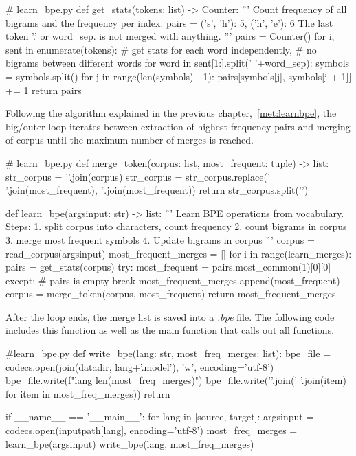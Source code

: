 \begin{python}
# learn_bpe.py
def get_stats(tokens: list) -> Counter:
  '''
  Count frequency of all bigrams and the frequency per index.
  pairs = {
    ('s', 'h'): 5,
    ('h', 'e'): 6
  }
  The last token '.' or word_sep. is not merged with anything.
  '''
  pairs = Counter()
  for i, sent in enumerate(tokens):
    # get stats for each word independently, 
    # no bigrams between different words
    for word in sent[1:].split(' '+word_sep):
      symbols = symbols.split()
      for j in range(len(symbols) - 1):
        pairs[symbols[j], symbols[j + 1]] += 1
  return pairs
\end{python}

Following the algorithm explained in the previous chapter,~\ref{met:learnbpe}, the big/outer loop iterates between extraction of highest frequency pairs and merging of corpus until the maximum number of merges is reached.

\begin{python}
# learn_bpe.py
def merge_token(corpus: list, most_frequent: tuple) -> list:
  str_corpus = '\n'.join(corpus)
  str_corpus = str_corpus.replace(' '.join(most_frequent), ''.join(most_frequent))
  return str_corpus.split('\n')

def learn_bpe(argsinput: str) -> list:
  '''
  Learn BPE operations from vocabulary. Steps:
  1. split corpus into characters, count frequency
  2. count bigrams in corpus
  3. merge most frequent symbols
  4. Update bigrams in corpus 
  '''
  corpus = read_corpus(argsinput)
  most_frequent_merges = []
  for i in range(learn_merges):
    pairs = get_stats(corpus)
    try:
      most_frequent = pairs.most_common(1)[0][0]
    except:
      # pairs is empty
      break
    most_frequent_merges.append(most_frequent)
    corpus = merge_token(corpus, most_frequent)
  return most_frequent_merges
\end{python}

After the loop ends, the merge list is saved into a \emph{.bpe} file. The following code includes this function as well as the main function that calls out all functions.

\begin{python}
#learn_bpe.py
def write_bpe(lang: str, most_freq_merges: list):
  bpe_file = codecs.open(join(datadir, lang+'.model'), 'w', encoding='utf-8')
  bpe_file.write(f"{lang} {len(most_freq_merges)}\n")
  bpe_file.write('\n'.join(' '.join(item) for item in most_freq_merges))
  return

if __name__ == '__main__':
  for lang in [source, target]:
    argsinput = codecs.open(inputpath[lang], encoding='utf-8')
    most_freq_merges = learn_bpe(argsinput)
    write_bpe(lang, most_freq_merges)
\end{python}

